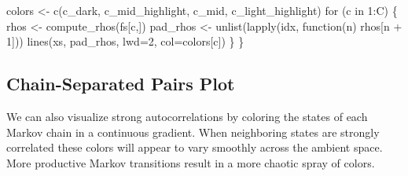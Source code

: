 \documentclass[
  letterpaper,
  DIV=11,
  numbers=noendperiod]{scrartcl}
\newenvironment{Shaded}{\begin{snugshade}}{\end{snugshade}}
\newcommand{\AttributeTok}[1]{\textcolor[rgb]{0.40,0.45,0.13}{#1}}
\newcommand{\ControlFlowTok}[1]{\textcolor[rgb]{0.00,0.23,0.31}{#1}}
\newcommand{\DecValTok}[1]{\textcolor[rgb]{0.68,0.00,0.00}{#1}}
\newcommand{\FunctionTok}[1]{\textcolor[rgb]{0.28,0.35,0.67}{#1}}
\newcommand{\NormalTok}[1]{\textcolor[rgb]{0.00,0.23,0.31}{#1}}
\newcommand{\OtherTok}[1]{\textcolor[rgb]{0.00,0.23,0.31}{#1}}
\newcommand{\SpecialCharTok}[1]{\textcolor[rgb]{0.37,0.37,0.37}{#1}}
\begin{document}
\begin{Shaded}
\begin{Highlighting}[]
\NormalTok{  colors }\OtherTok{\textless{}{-}} \FunctionTok{c}\NormalTok{(c\_dark, c\_mid\_highlight, c\_mid, c\_light\_highlight)}
  \ControlFlowTok{for}\NormalTok{ (c }\ControlFlowTok{in} \DecValTok{1}\SpecialCharTok{:}\NormalTok{C) \{}
\NormalTok{    rhos }\OtherTok{\textless{}{-}} \FunctionTok{compute\_rhos}\NormalTok{(fs[c,])}
\NormalTok{    pad\_rhos }\OtherTok{\textless{}{-}} \FunctionTok{unlist}\NormalTok{(}\FunctionTok{lapply}\NormalTok{(idx, }\ControlFlowTok{function}\NormalTok{(n) rhos[n }\SpecialCharTok{+} \DecValTok{1}\NormalTok{]))}
    \FunctionTok{lines}\NormalTok{(xs, pad\_rhos, }\AttributeTok{lwd=}\DecValTok{2}\NormalTok{, }\AttributeTok{col=}\NormalTok{colors[c])}
\NormalTok{  \}}
\NormalTok{\}}
\end{Highlighting}
\end{Shaded}

\hypertarget{chain-separated-pairs-plot}{%
\subsection{Chain-Separated Pairs
Plot}\label{chain-separated-pairs-plot}}

We can also visualize strong autocorrelations by coloring the states of
each Markov chain in a continuous gradient. When neighboring states are
strongly correlated these colors will appear to vary smoothly across the
ambient space. More productive Markov transitions result in a more
chaotic spray of colors.
\end{document}
